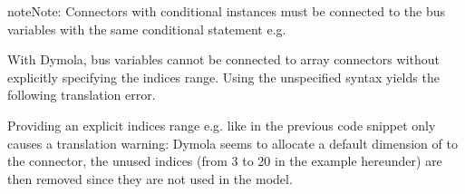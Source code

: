 \documentclass[letterpaper,10pt, openany,english]{sphinxmanual}
\begin{document}
\begin{sphinxadmonition}{note}{Note:}
Connectors with conditional instances must be connected to the bus variables with the same conditional statement e.g.

\begin{sphinxVerbatim}[commandchars=\\\{\}]
  
    \PYG{p}{[}\PYG{p}{],} \PYG{p}{[}\PYG{p}{])}
 
\end{sphinxVerbatim}

With Dymola, bus variables cannot be connected to array connectors without explicitly specifying the indices range.
Using the unspecified \sphinxcode{\sphinxupquote{{[}:{]}}} syntax yields the following translation error.

\begin{sphinxVerbatim}[commandchars=\\\{\}]
   \PYG{p}{[}\PYG{p}{]}       \PYG{p}{[}\PYG{p}{],} \PYG{p}{[}\PYG{p}{]);}
\end{sphinxVerbatim}

Providing an explicit indices range e.g. \sphinxcode{\sphinxupquote{{[}1:numZon{]}}} like in the previous code snippet only causes a translation warning: Dymola seems to allocate a default dimension of  to the connector, the unused indices (from 3 to 20 in the example hereunder) are then removed since they are not used in the model.

\begin{sphinxVerbatim}[commandchars=\\\{\}]
   \PYG{p}{[}\PYG{p}{]}        


\end{sphinxVerbatim}
\end{sphinxadmonition}
\end{document}
